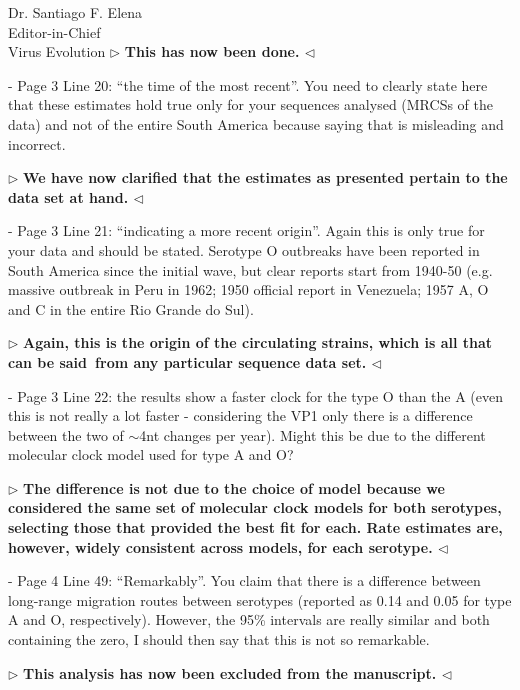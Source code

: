 \documentclass[ucla,biomath,12pt,noaddrfooter,datefrom]{UC_letter}
\newenvironment{reply}{$\triangleright$\bf}{$\triangleleft$}
\begin{document}
\begin{letter}{
Dr. Santiago F. Elena \\
Editor-in-Chief \\
Virus Evolution
}
\begin{reply}
This has now been done.
\end{reply}

-       Page 3 Line 20: ``the time of the most recent''. 
You need to clearly state here that these estimates hold true only for your sequences analysed (MRCSs of the data) and not of the entire South America because saying that is misleading and incorrect.

\begin{reply}
We have now clarified that the estimates as presented pertain to the data set at hand.
\end{reply}

-       Page 3 Line 21: ``indicating a more recent origin''. 
Again this is only true for your data and should be stated. 
Serotype O outbreaks have been reported in South America since the initial wave, but clear reports start from 1940-50 (e.g. massive outbreak in Peru in 1962; 1950 official report in Venezuela; 1957 A, O and C in the entire Rio Grande do Sul).

\begin{reply}
Again, this is the origin of the circulating strains, which is all that can be said~\textbf{from any particular sequence data set}.
\end{reply}

-       Page 3 Line 22: the results show a faster clock for the type O than the A (even this is not really a lot faster - considering the VP1 only there is a difference between the two of $\sim$4nt changes per year). 
Might this be due to the different molecular clock model used for type A and O?

\begin{reply}
The difference is not due to the choice of model because we considered the same set of molecular clock models for both serotypes, selecting those that provided the best fit for each.
Rate estimates are, however, widely consistent across models, for each serotype.
\end{reply}

-       Page 4 Line 49: ``Remarkably''. 
You claim that there is a difference between long-range migration routes between serotypes (reported as 0.14 and 0.05 for type A and O, respectively). 
However, the 95\% intervals are really similar and both containing the zero, I should then say that this is not so remarkable.

\begin{reply}
This analysis has now been excluded from the manuscript.
\end{reply}


\end{letter}
\end{document}
